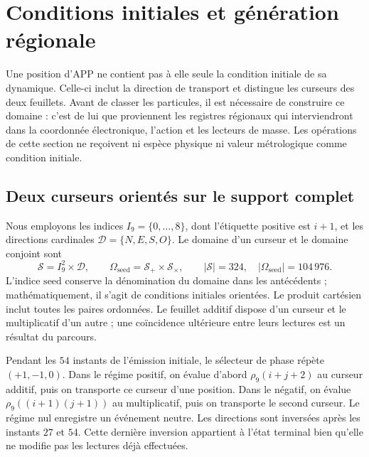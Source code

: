 \section{Conditions initiales et génération régionale}
\label{vi:vi:reg:seccion}\label{vi:sec:extension}\label{vi:sec:generacion}

Une position d’APP ne contient pas à elle seule la condition initiale de sa
dynamique. Celle-ci inclut la direction de transport et distingue les curseurs
des deux feuillets. Avant de classer les particules, il est nécessaire de
construire ce domaine : c’est de lui que proviennent les registres régionaux qui
interviendront dans la coordonnée électronique, l’action et les lecteurs de
masse. Les opérations de cette section ne reçoivent ni espèce physique ni
valeur métrologique comme condition initiale.

\subsection{Deux curseurs orientés sur le support complet}

Nous employons les indices \(I_9=\{0,\ldots,8\}\), dont l’étiquette positive est
\(i+1\), et les directions cardinales \(\mathcal D=\{N,E,S,O\}\).
Le domaine d’un curseur et le domaine conjoint sont
\begin{equation}
 \mathcal S=I_9^2\times\mathcal D,\qquad
 \Omega_{\mathrm{seed}}=\mathcal S_+\times\mathcal S_\times,
 \qquad |\mathcal S|=324,\quad
 |\Omega_{\mathrm{seed}}|=104\,976.
 \label{vi:eq:semillas}
\end{equation}
L’indice \(\mathrm{seed}\) conserve la dénomination du domaine dans
les antécédents ; mathématiquement, il s’agit de conditions initiales
orientées. Le produit cartésien inclut toutes les paires ordonnées.
Le feuillet additif dispose d’un curseur et le multiplicatif d’un autre ; une
coïncidence ultérieure entre leurs lectures est un résultat du parcours.

Pendant les \(54\) instants de l’émission initiale, le sélecteur de phase
répète \((+1,-1,0)\). Dans le régime positif, on évalue d’abord
\(\rho_9(i+j+2)\) au curseur additif, puis on transporte ce
curseur d’une position. Dans le négatif, on évalue
\(\rho_9((i+1)(j+1))\) au multiplicatif, puis on transporte
le second curseur. Le régime nul enregistre un événement neutre. Les
directions sont inversées après les instants \(27\) et \(54\).
Cette dernière inversion appartient à l’état terminal bien qu’elle ne modifie pas
les lectures déjà effectuées.

